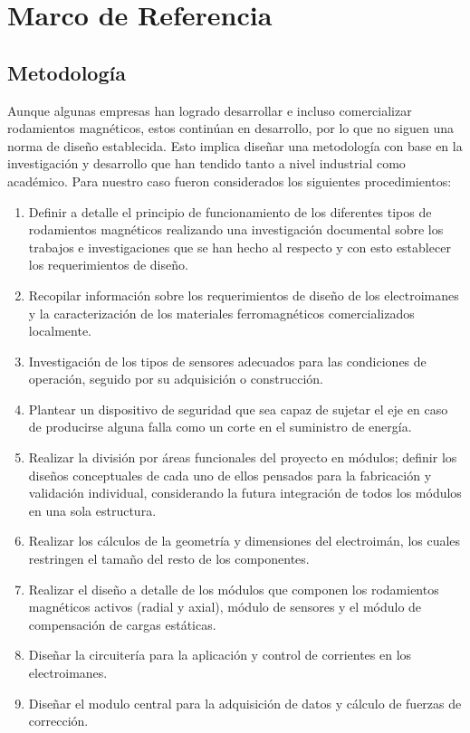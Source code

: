 %
\chapter{Marco de Referencia}
\label{sec:related}



\section{Metodología}
\label{sec:related:sec1}

Aunque algunas empresas han logrado desarrollar e incluso comercializar rodamientos magnéticos, estos continúan en desarrollo, por lo que no siguen una norma de diseño establecida. Esto implica diseñar una metodología con base en la investigación y desarrollo que han tendido tanto a nivel industrial como académico. Para nuestro caso fueron considerados los siguientes procedimientos: 
\begin{enumerate}
\item Definir a detalle el principio de funcionamiento de los diferentes tipos de rodamientos magnéticos realizando una investigación documental sobre los trabajos e investigaciones que se han hecho al respecto y con esto establecer los requerimientos de diseño.
\item Recopilar información sobre los requerimientos de diseño de los electroimanes y la caracterización de los materiales ferromagnéticos comercializados localmente.
\item Investigación de los tipos de sensores adecuados para las condiciones de operación, seguido por su adquisición o construcción.
\item Plantear un dispositivo de seguridad que sea capaz de sujetar el eje en caso de producirse alguna falla como un corte en el suministro de energía.  
\item Realizar la división por áreas funcionales del proyecto en módulos; definir los diseños conceptuales de cada uno de ellos pensados para la fabricación y validación individual, considerando la futura integración de todos los módulos en una sola estructura. 
\item Realizar los cálculos de la geometría y dimensiones del electroimán, los cuales restringen el tamaño del resto de los componentes. 
\item Realizar el diseño a detalle de los módulos que componen los rodamientos magnéticos activos (radial y axial), módulo de sensores y el módulo de compensación de cargas estáticas.
\item Diseñar la circuitería para la aplicación y control de corrientes en los electroimanes.
\item Diseñar el modulo central para la adquisición de datos y cálculo de fuerzas de corrección. 
\end{enumerate} 



